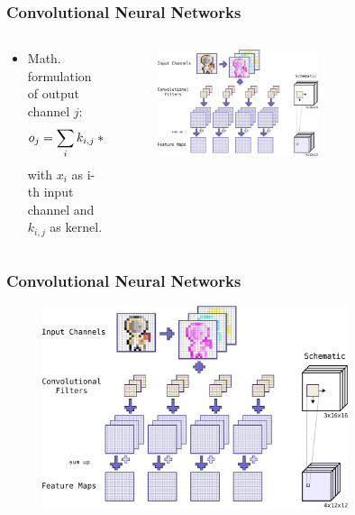 \begin{frame}
  \frametitle{Convolutional Neural Networks}
  \vspace{-0.75cm}
  \begin{columns}
    \begin{column}{0.5\textwidth}
      \begin{itemize}
        \small
        \item Math. formulation of output channel $j$:
        \begin{equation*}
          \footnotesize
          o_j = \sum_{i} k_{i, j} \ast x_i,
        \end{equation*}
        \footnotesize
        with $x_i$ as i-th input channel and $k_{i, j}$ as kernel.   
      \end{itemize}
    \end{column}
    \begin{column}{0.5\textwidth}
      \vspace{0.75cm}
      \centering
      \begin{figure} \includegraphics[width=0.6\textwidth]{../4_nn/figs/nn_theory_cnn_basics.pdf} \end{figure}
      \vfill
    \end{column}
  \end{columns}
\end{frame}

\begin{frame}
  \frametitle{Convolutional Neural Networks}
  \begin{figure} \includegraphics[width=0.8\textwidth]{../4_nn/figs/nn_theory_cnn_basics.pdf} \end{figure}
\end{frame}

